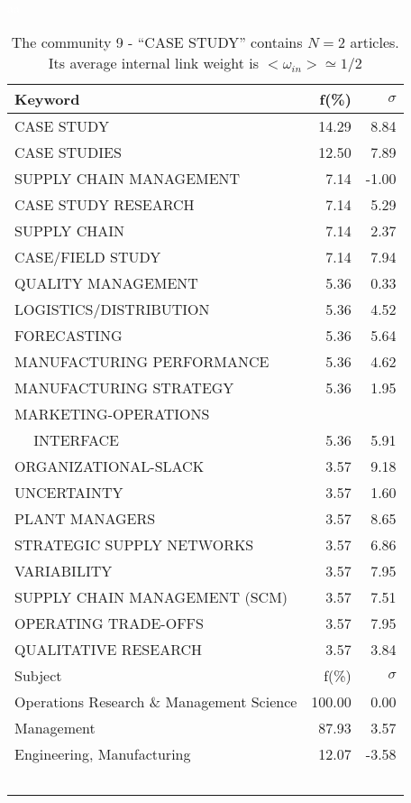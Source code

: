 \documentclass[a4paper,11pt]{report}
\begin{document}
\begin{landscape}
\clearpage

\begin{table}[!ht]
\caption{The community 9 - ``CASE STUDY'' contains $N = 2$ articles. Its average internal link weight is $<\omega_{in}> \simeq 1/2$ }
\textcolor{white}{aa}\\
{\scriptsize\begin{tabular}{|l r r|}
\hline
Keyword & f(\%) & $\sigma$\\
\hline
CASE STUDY & 14.29 & 8.84\\
CASE STUDIES & 12.50 & 7.89\\
SUPPLY CHAIN MANAGEMENT & 7.14 & -1.00\\
CASE STUDY RESEARCH & 7.14 & 5.29\\
SUPPLY CHAIN & 7.14 & 2.37\\
CASE/FIELD STUDY & 7.14 & 7.94\\
QUALITY MANAGEMENT & 5.36 & 0.33\\
LOGISTICS/DISTRIBUTION & 5.36 & 4.52\\
FORECASTING & 5.36 & 5.64\\
MANUFACTURING PERFORMANCE & 5.36 & 4.62\\
MANUFACTURING STRATEGY & 5.36 & 1.95\\
MARKETING-OPERATIONS &  & \\
$\quad$ INTERFACE & 5.36 & 5.91\\
ORGANIZATIONAL-SLACK & 3.57 & 9.18\\
UNCERTAINTY & 3.57 & 1.60\\
PLANT MANAGERS & 3.57 & 8.65\\
STRATEGIC SUPPLY NETWORKS & 3.57 & 6.86\\
VARIABILITY & 3.57 & 7.95\\
SUPPLY CHAIN MANAGEMENT (SCM) & 3.57 & 7.51\\
OPERATING TRADE-OFFS & 3.57 & 7.95\\
QUALITATIVE RESEARCH & 3.57 & 3.84\\
\hline
\hline
Subject & f(\%) & $\sigma$\\
\hline
Operations Research \& Management Science & 100.00 & 0.00\\
Management & 87.93 & 3.57\\
Engineering, Manufacturing & 12.07 & -3.58\\
 &  & \\
 &  & \\
 &  & \\
 &  & \\
 &  & \\

\end{tabular}}
\end{table}
\end{landscape}
\end{document}
